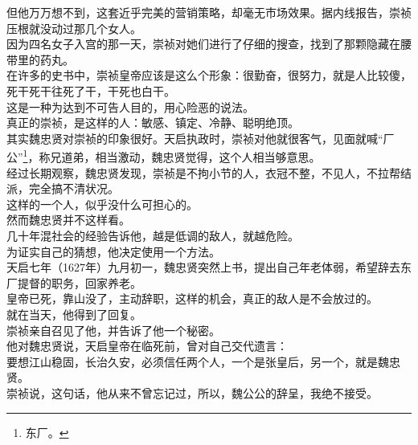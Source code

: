 \begin{multicols}{\theparacolNo}
但他万万想不到，这套近乎完美的营销策略，却毫无市场效果。据内线报告，崇祯压根就没动过那几个女人。\\

因为四名女子入宫的那一天，崇祯对她们进行了仔细的搜查，找到了那颗隐藏在腰带里的药丸。\\

在许多的史书中，崇祯皇帝应该是这么个形象：很勤奋，很努力，就是人比较傻，死干死干往死了干，干死也白干。\\

这是一种为达到不可告人目的，用心险恶的说法。\\

真正的崇祯，是这样的人：敏感、镇定、冷静、聪明绝顶。\\

其实魏忠贤对崇祯的印象很好。天启执政时，崇祯对他就很客气，见面就喊“厂公”\footnote{东厂。}，称兄道弟，相当激动，魏忠贤觉得，这个人相当够意思。\\

经过长期观察，魏忠贤发现，崇祯是不拘小节的人，衣冠不整，不见人，不拉帮结派，完全搞不清状况。\\

这样的一个人，似乎没什么可担心的。\\

然而魏忠贤并不这样看。\\

几十年混社会的经验告诉他，越是低调的敌人，就越危险。\\

为证实自己的猜想，他决定使用一个方法。\\

天启七年（1627年）九月初一，魏忠贤突然上书，提出自己年老体弱，希望辞去东厂提督的职务，回家养老。\\

皇帝已死，靠山没了，主动辞职，这样的机会，真正的敌人是不会放过的。\\

就在当天，他得到了回复。\\

崇祯亲自召见了他，并告诉了他一个秘密。\\

他对魏忠贤说，天启皇帝在临死前，曾对自己交代遗言：\\

要想江山稳固，长治久安，必须信任两个人，一个是张皇后，另一个，就是魏忠贤。\\

崇祯说，这句话，他从来不曾忘记过，所以，魏公公的辞呈，我绝不接受。\\


\end{multicols}
